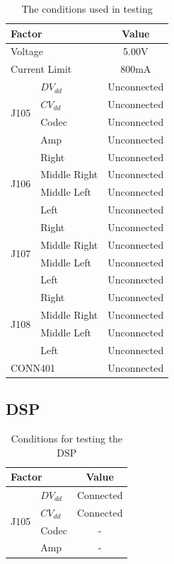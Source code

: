 \begin{table}[H]
	\centering
	\begin{tabular}[c]{| l | l | c |}
		\hline
		\multicolumn{2}{|l|}{Factor}		& Value	\\
		\hline
		\multicolumn{2}{|l|}{Voltage}		& 5.00V	\\
		\multicolumn{2}{|l|}{Current Limit}	& 800mA	\\
		\hline
		\multirow{4}{*}{J105}	& $DV_{dd}$	& Unconnected	\\
					& $CV_{dd}$	& Unconnected	\\
					& Codec		& Unconnected	\\
					& Amp		& Unconnected	\\
		\hline
		\multirow{4}{*}{J106}	& Right		& Unconnected	\\
					& Middle Right	& Unconnected	\\
					& Middle Left	& Unconnected	\\
					& Left		& Unconnected	\\
		\hline
		\multirow{4}{*}{J107}	& Right		& Unconnected	\\
					& Middle Right	& Unconnected	\\
					& Middle Left	& Unconnected	\\
					& Left		& Unconnected	\\
		\hline
		\multirow{4}{*}{J108}	& Right		& Unconnected	\\
					& Middle Right	& Unconnected	\\
					& Middle Left	& Unconnected	\\
					& Left		& Unconnected	\\
		\hline
		\multicolumn{2}{|l|}{CONN401}		& Unconnected	\\
		\hline
	\end{tabular}
	\caption{The conditions used in testing}
	\label{tab:testconditions}
\end{table}

\subsection{DSP}
\begin{table}[H]
	\centering
	\begin{tabular}[c]{| l | l | c |}
		\hline
		\multicolumn{2}{|l|}{Factor}		& Value	\\
		\hline
		\multirow{4}{*}{J105}	& $DV_{dd}$	& Connected	\\
					& $CV_{dd}$	& Connected	\\
					& Codec		& -		\\
					& Amp		& -		\\
		\hline
	\end{tabular}
	\caption{Conditions for testing the DSP}
	\label{tab:dsptestconditions}
\end{table}

